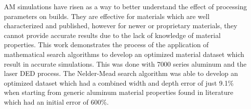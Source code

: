 \label{abstract}

\Acf{AM} simulations have risen as a way to better understand the effect of processing parameters on builds.  They are effective for materials which are well characterized and published, however for newer or proprietary materials, they cannot provide accurate results due to the lack of knowledge of material properties.  This work demonstrates the process of the application of mathematical search algorithms to develop an optimized material dataset which result in accurate simulations.  This was done with 7000 series aluminum and the laser \ac{DED} process.  The Nelder-Mead search algorithm was able to develop an optimized dataset which had a combined width and depth error of just 9.1\% when starting from generic aluminum material properties found in literature which had an initial error of 600\%.